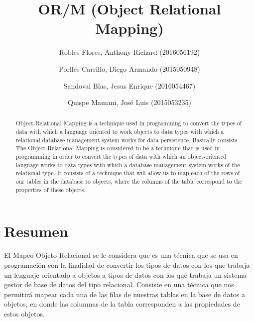 \documentclass[preprint,12pt]{elsarticle}
\begin{document}
	
	\begin{frontmatter}

		\title{\huge OR/M (Object Relational Mapping)}
		
		\author{Robles Flores, Anthony Richard	              (2016056192)}
		\author{Porlles Carrillo, Diego Armando              (2015050948)}
		\author{Sandoval Blas, Jesus Enrique           (2016054467)}
		\author{Quispe Mamani, José Luis              (2015053235)}
		
		\address{Tacna, Perú}
		
		\begin{abstract}

Object-Relational Mapping is a technique used in programming to convert the types of data with which a language oriented to work
objects to data types with which a relational database management system works for data persistence. Basically consists
The Object-Relational Mapping is considered to be a technique that is used in programming in order to convert the types of data with which an object-oriented language works 
to data types with which a database management system works of the relational type. It consists of a technique that will allow us to map each of the rows of our tables in the database 
to objects, where the columns of the table correspond to the properties of these objects.
		\end{abstract}
\end{frontmatter}


\section{Resumen}

El Mapeo Objeto-Relacional se le considera que es una técnica que se usa en programación con la finalidad de convertir
 los tipos de datos con los que trabaja un lenguaje orientado a objetos a tipos de datos con los que trabaja un sistema gestor 
de base de datos del tipo relacional. Consiste en una técnica que nos permitirá mapear cada una de las filas de nuestras tablas
 en la base de datos a objetos, en donde las columnas de la tabla corresponden a las propiedades de estos objetos.

\end{document}

